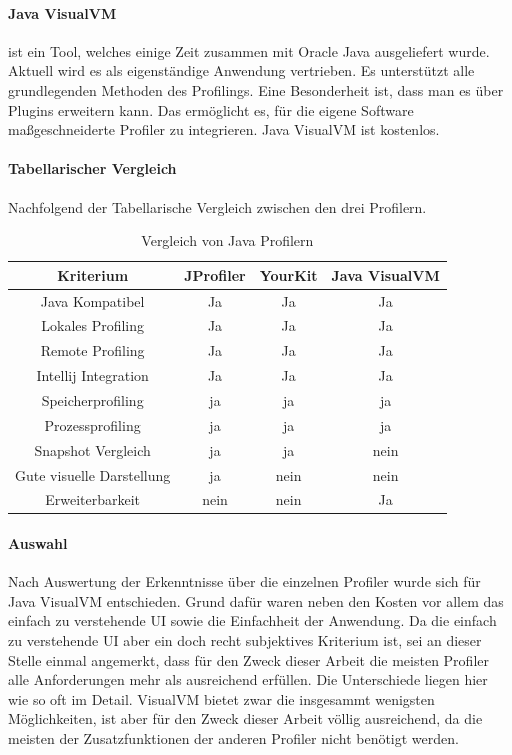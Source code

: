 \documentclass[a4paper,12pt]{scrreprt}
\begin{document}
\paragraph{Java VisualVM}

ist ein Tool, welches einige Zeit zusammen mit Oracle Java ausgeliefert wurde. ~\cite{WEBSITE:5} Aktuell wird es als eigenständige Anwendung vertrieben. Es unterstützt alle grundlegenden Methoden des Profilings. Eine Besonderheit ist, dass man es über Plugins erweitern kann. Das ermöglicht es, für die eigene Software maßgeschneiderte Profiler zu integrieren. Java VisualVM ist kostenlos.

\paragraph{Tabellarischer Vergleich}

Nachfolgend der Tabellarische Vergleich zwischen den drei Profilern. 
\begin{table}[h]
  \centering
  \caption{Vergleich von Java Profilern}
  \begin{tabular}{cccc}
    Kriterium & JProfiler & YourKit & Java VisualVM\\
    \hline
    Java Kompatibel & Ja& Ja & Ja\\
    Lokales Profiling &Ja&Ja&Ja\\
    Remote Profiling&Ja&Ja&Ja\\
    Intellij Integration&Ja&Ja&Ja\\
    Speicherprofiling&ja&ja&ja\\
    Prozessprofiling&ja&ja&ja\\
    Snapshot Vergleich&ja&ja&nein\\
    Gute visuelle Darstellung &ja&nein&nein\\
    Erweiterbarkeit&nein&nein&Ja
  \end{tabular}
  \label{tab:1}
\end{table}

\paragraph{Auswahl}
Nach Auswertung der Erkenntnisse über die einzelnen Profiler wurde sich für Java VisualVM entschieden.  Grund dafür waren neben den Kosten vor allem das einfach zu verstehende UI sowie die Einfachheit der Anwendung. Da die einfach zu verstehende UI aber ein doch recht subjektives Kriterium ist, sei an dieser Stelle einmal angemerkt, dass für den Zweck dieser Arbeit die meisten Profiler alle Anforderungen mehr als ausreichend erfüllen. Die Unterschiede liegen hier wie so oft im Detail. VisualVM bietet zwar die insgesammt wenigsten Möglichkeiten, ist aber für den Zweck dieser Arbeit völlig ausreichend, da die meisten der Zusatzfunktionen der anderen Profiler nicht benötigt werden. 
\end{document}
